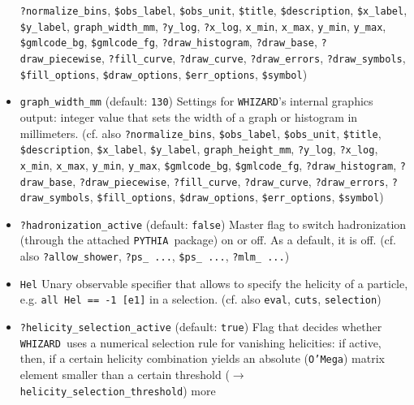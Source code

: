 \documentclass[12pt]{book}
\newcommand{\ttt}[1]{\texttt{#1}}
\newcommand{\whizard}{\texttt{WHIZARD}}
\newcommand{\oMega}{\texttt{O'Mega}}
\newcommand{\pythia}{\texttt{PYTHIA}}
\begin{document}
\begin{itemize}
\ttt{?normalize\_bins}, \ttt{\$obs\_label}, \ttt{\$obs\_unit},
\ttt{\$title}, \ttt{\$description}, \ttt{\$x\_label},
\ttt{\$y\_label}, \ttt{graph\_width\_mm}, 
\ttt{?y\_log}, \ttt{?x\_log}, \ttt{x\_min}, \ttt{x\_max},
\ttt{y\_min}, \ttt{y\_max}, \ttt{\$gmlcode\_bg}, \ttt{\$gmlcode\_fg},
\ttt{?draw\_histogram}, \ttt{?draw\_base}, \newline \ttt{?draw\_piecewise},
\ttt{?fill\_curve}, \ttt{?draw\_curve}, \ttt{?draw\_errors},
\ttt{?draw\_symbols}, \newline \ttt{\$fill\_options}, \ttt{\$draw\_options},
\ttt{\$err\_options}, \ttt{\$symbol})
\item
\ttt{graph\_width\_mm} \qquad (default: \ttt{130}) \newline
Settings for \whizard's internal graphics output: integer value that
sets the width of a graph or histogram in millimeters. (cf. also
\ttt{?normalize\_bins}, \ttt{\$obs\_label}, \ttt{\$obs\_unit},
\ttt{\$title}, \ttt{\$description}, \ttt{\$x\_label},
\ttt{\$y\_label}, \ttt{graph\_height\_mm}, 
\ttt{?y\_log}, \ttt{?x\_log}, \ttt{x\_min}, \ttt{x\_max},
\ttt{y\_min}, \ttt{y\_max}, \ttt{\$gmlcode\_bg}, \ttt{\$gmlcode\_fg},
\ttt{?draw\_histogram}, \ttt{?draw\_base}, \newline \ttt{?draw\_piecewise},
\ttt{?fill\_curve}, \ttt{?draw\_curve}, \ttt{?draw\_errors},
\ttt{?draw\_symbols}, \newline \ttt{\$fill\_options}, \ttt{\$draw\_options},
\ttt{\$err\_options}, \ttt{\$symbol})
\item
\ttt{?hadronization\_active} \qquad (default: \ttt{false}) \newline
Master flag to switch hadronization (through the attached \pythia\
package) on or off. As a default, it is off. (cf. also
\ttt{?allow\_shower}, \ttt{?ps\_ ...}, \ttt{\$ps\_ ...}, \ttt{?mlm\_
  ...})  
\item
\ttt{Hel} \newline
Unary observable specifier that allows to specify the helicity of a
particle, e.g. \ttt{all Hel == -1 [e1]} in a selection. (cf. also
\ttt{eval}, \ttt{cuts}, \ttt{selection})
\item
\ttt{?helicity\_selection\_active} \qquad (default: \ttt{true})
\newline
Flag that decides whether \whizard\ uses a numerical selection rule
for vanishing helicities: if active, then, if a certain helicity
combination yields an absolute (\oMega) matrix element smaller than a
certain threshold ($\to$ \ttt{helicity\_selection\_threshold}) more

\end{itemize}
\end{document}
